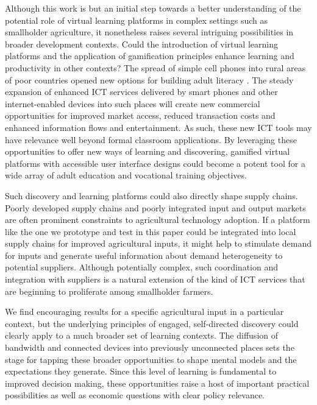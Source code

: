 \documentclass[12pt,letterpaper]{article}
\begin{document}
Although this work is but an initial step towards a better understanding of the potential role of virtual learning platforms in complex settings such as smallholder agriculture, it nonetheless raises several intriguing possibilities in broader development contexts. Could the introduction of virtual learning platforms and the application of gamification principles enhance learning and productivity in other contexts? The spread of simple cell phones into rural areas of poor countries opened new options for building adult literacy \citep{aker2012can}. The steady expansion of enhanced ICT services delivered by smart phones and other internet-enabled devices into such places will create new commercial opportunities for improved market access, reduced transaction costs and enhanced information flows and entertainment. As such, these new ICT tools may have relevance well beyond formal classroom applications. By leveraging these opportunities to offer new ways of learning and discovering, gamified virtual platforms with accessible user interface designs could become a potent tool for a wide array of adult education and vocational training objectives.

Such discovery and learning platforms could also directly shape supply chains. Poorly developed supply chains and poorly integrated input and output markets are often prominent constraints to agricultural technology adoption. If a platform like the one we prototype and test in this paper could be integrated into local supply chains for improved agricultural inputs, it might help to stimulate demand for inputs and generate useful information about demand heterogeneity to potential suppliers. Although potentially complex, such coordination and integration with suppliers is a natural extension of the kind of ICT services that are beginning to proliferate among smallholder farmers.  

We find encouraging results for a specific agricultural input in a particular context, but the underlying principles of engaged, self-directed discovery could clearly apply to a much broader set of learning contexts. The diffusion of bandwidth and connected devices into previously unconnected places sets the stage for tapping these broader opportunities to shape mental models and the expectations they generate. Since this level of learning is fundamental to improved decision making, these opportunities raise a host of important practical possibilities as well as economic questions with clear policy relevance. 


 \newpage
\end{document}
